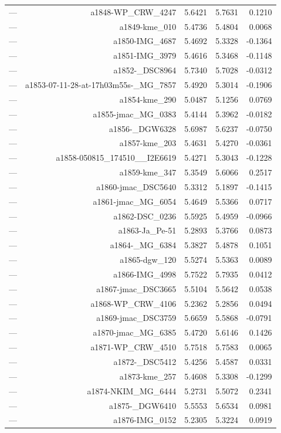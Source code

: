 \begin{table}[htbp]
\begin{tabular}{lrrrr}
— & a1848-WP_CRW_4247 & 5.6421 & 5.7631 & 0.1210 \\
— & a1849-kme_010 & 5.4736 & 5.4804 & 0.0068 \\
— & a1850-IMG_4687 & 5.4692 & 5.3328 & -0.1364 \\
— & a1851-IMG_3979 & 5.4616 & 5.3468 & -0.1148 \\
— & a1852-_DSC8964 & 5.7340 & 5.7028 & -0.0312 \\
— & a1853-07-11-28-at-17h03m55s-_MG_7857 & 5.4920 & 5.3014 & -0.1906 \\
— & a1854-kme_290 & 5.0487 & 5.1256 & 0.0769 \\
— & a1855-jmac_MG_0383 & 5.4144 & 5.3962 & -0.0182 \\
— & a1856-_DGW6328 & 5.6987 & 5.6237 & -0.0750 \\
— & a1857-kme_203 & 5.4631 & 5.4270 & -0.0361 \\
— & a1858-050815_174510__I2E6619 & 5.4271 & 5.3043 & -0.1228 \\
— & a1859-kme_347 & 5.3549 & 5.6066 & 0.2517 \\
— & a1860-jmac_DSC5640 & 5.3312 & 5.1897 & -0.1415 \\
— & a1861-jmac_MG_6054 & 5.4649 & 5.5366 & 0.0717 \\
— & a1862-DSC_0236 & 5.5925 & 5.4959 & -0.0966 \\
— & a1863-Ja_Pe-51 & 5.2893 & 5.3766 & 0.0873 \\
— & a1864-_MG_6384 & 5.3827 & 5.4878 & 0.1051 \\
— & a1865-dgw_120 & 5.5274 & 5.5363 & 0.0089 \\
— & a1866-IMG_4998 & 5.7522 & 5.7935 & 0.0412 \\
— & a1867-jmac_DSC3665 & 5.5104 & 5.5642 & 0.0538 \\
— & a1868-WP_CRW_4106 & 5.2362 & 5.2856 & 0.0494 \\
— & a1869-jmac_DSC3759 & 5.6659 & 5.5868 & -0.0791 \\
— & a1870-jmac_MG_6385 & 5.4720 & 5.6146 & 0.1426 \\
— & a1871-WP_CRW_4510 & 5.7518 & 5.7583 & 0.0065 \\
— & a1872-_DSC5412 & 5.4256 & 5.4587 & 0.0331 \\
— & a1873-kme_257 & 5.4608 & 5.3308 & -0.1299 \\
— & a1874-NKIM_MG_6444 & 5.2731 & 5.5072 & 0.2341 \\
— & a1875-_DGW6410 & 5.5553 & 5.6534 & 0.0981 \\
— & a1876-IMG_0152 & 5.2305 & 5.3224 & 0.0919 \\

\end{tabular}
\end{table}
